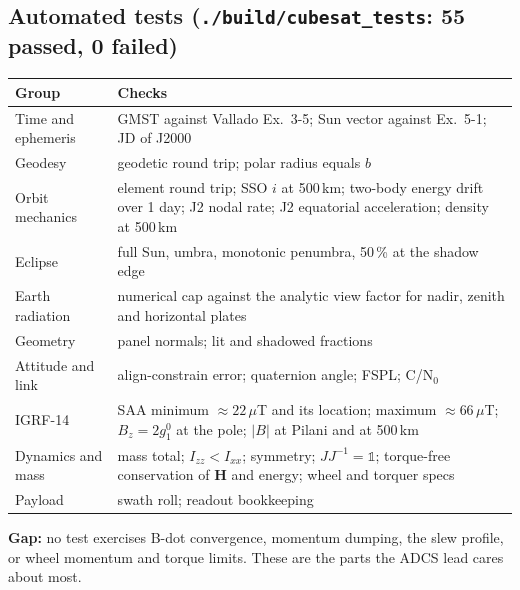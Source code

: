 \documentclass[11pt,a4paper]{article}
\newcommand{\vb}[1]{\boldsymbol{#1}}
\begin{document}
\subsection{Automated tests (\texttt{./build/cubesat\_tests}: 55 passed, 0 failed)}
\begin{center}
\begin{tabular}{@{}L{4.2cm}L{11.5cm}@{}}
\toprule
Group & Checks\\
\midrule
Time and ephemeris & GMST against Vallado Ex.~3-5; Sun vector against Ex.~5-1; JD of J2000\\
Geodesy & geodetic round trip; polar radius equals $b$\\
Orbit mechanics & element round trip; SSO $i$ at 500\,km; two-body energy drift over 1 day; J2 nodal rate; J2 equatorial acceleration; density at 500\,km\\
Eclipse & full Sun, umbra, monotonic penumbra, 50\,\% at the shadow edge\\
Earth radiation & numerical cap against the analytic view factor for nadir, zenith and horizontal plates\\
Geometry & panel normals; lit and shadowed fractions\\
Attitude and link & align-constrain error; quaternion angle; FSPL; C/N$_0$\\
IGRF-14 & SAA minimum $\approx 22\,\mu$T and its location; maximum $\approx 66\,\mu$T; $B_z = 2g_1^0$ at the pole; $|B|$ at Pilani and at 500\,km\\
Dynamics and mass & mass total; $I_{zz} < I_{xx}$; symmetry; $JJ^{-1} = \mathbb 1$; torque-free conservation of $\vb H$ and energy; wheel and torquer specs\\
Payload & swath roll; readout bookkeeping\\
\bottomrule
\end{tabular}
\end{center}
\textbf{Gap:} no test exercises B-dot convergence, momentum dumping, the slew profile, or wheel momentum and torque limits. These are the parts the ADCS lead cares about most.

\end{document}
